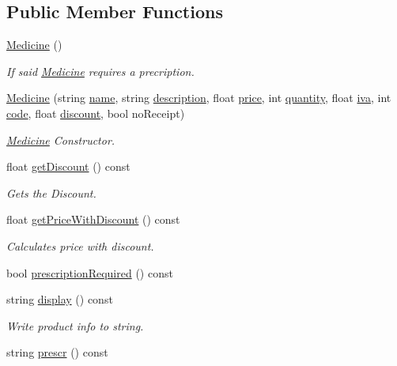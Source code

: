 \subsection*{Public Member Functions}
\begin{DoxyCompactItemize}
\item 
\hyperlink{classMedicine_a6a879be6fb9f5b9b16b465a5aff3f835}{Medicine} ()
\begin{DoxyCompactList}\small\item\em If said \hyperlink{classMedicine}{Medicine} requires a precription. \end{DoxyCompactList}\item 
\hyperlink{classMedicine_a6b66bb37ef10ea4951aa94577f1a1c58}{Medicine} (string \hyperlink{classProduct_acc9bddcf74112d85a6dc231db2269b8d}{name}, string \hyperlink{classProduct_ac39d552b24ce60549271a85aea3f5ed0}{description}, float \hyperlink{classProduct_ad1fd6ee6c8653bf81898668b1d01b05d}{price}, int \hyperlink{classProduct_a299430b8756aba9f6d44af46831791cc}{quantity}, float \hyperlink{classProduct_ac772b7a57928ccfdb02309bde2e4fa33}{iva}, int \hyperlink{classProduct_acf4c1bb9d62717e3b2ecaaf7ec5dffd7}{code}, float \hyperlink{classMedicine_a56e42f35d8edce81983df5837b6fee54}{discount}, bool no\+Receipt)
\begin{DoxyCompactList}\small\item\em \hyperlink{classMedicine}{Medicine} Constructor. \end{DoxyCompactList}\item 
float \hyperlink{classMedicine_aae7277cc1a23171b2d60225d0e11f24d}{get\+Discount} () const
\begin{DoxyCompactList}\small\item\em Gets the Discount. \end{DoxyCompactList}\item 
float \hyperlink{classMedicine_a313a6ad362c0746ddb96425b097a8f77}{get\+Price\+With\+Discount} () const
\begin{DoxyCompactList}\small\item\em Calculates price with discount. \end{DoxyCompactList}\item 
bool \hyperlink{classMedicine_ac69fcbbcfda660e3ee4df38282442dc4}{prescription\+Required} () const
\item 
string \hyperlink{classMedicine_a42cabfcd2dd5f04b10e5a01d86f5ee60}{display} () const
\begin{DoxyCompactList}\small\item\em Write product info to string. \end{DoxyCompactList}\item 
string \hyperlink{classMedicine_a502f519c44cfb89071af6a920fb773e3}{prescr} () const
\end{DoxyCompactItemize}
